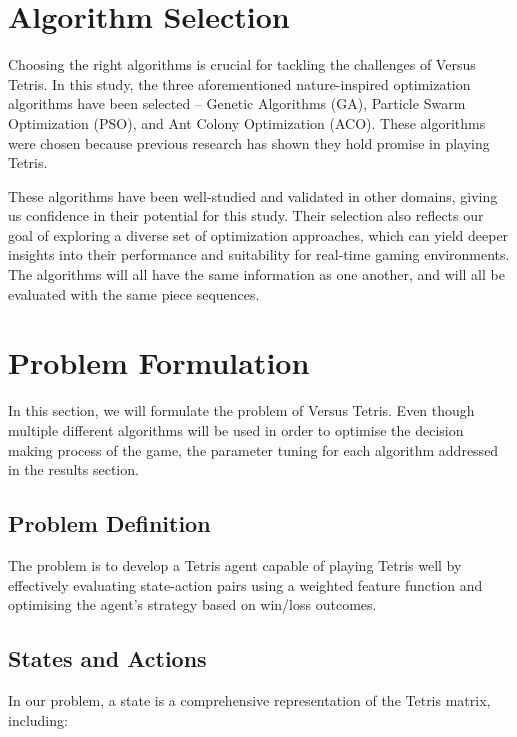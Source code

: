 \documentclass[a4paper, 12pt]{extreport}
\begin{document}
		\section{Algorithm Selection}\label{sec:algo-select}
			Choosing the right algorithms is crucial for tackling the challenges of Versus Tetris. In this study, the three aforementioned nature-inspired optimization algorithms have been selected -- Genetic Algorithms (GA), Particle Swarm Optimization (PSO), and Ant Colony Optimization (ACO). These algorithms were chosen because previous research has shown they hold promise in playing Tetris.
			
			These algorithms have been well-studied and validated in other domains, giving us confidence in their potential for this study. Their selection also reflects our goal of exploring a diverse set of optimization approaches, which can yield deeper insights into their performance and suitability for real-time gaming environments. The algorithms will all have the same information as one another, and will all be evaluated with the same piece sequences.
		
		\section{Problem Formulation}\label{sec:problem-formulation}
		
			In this section, we will formulate the problem of Versus Tetris. Even though multiple different algorithms will be used in order to optimise the decision making process of the game, the parameter tuning for each algorithm addressed in the results section.
		
			\subsection{Problem Definition}
			
				The problem is to develop a Tetris agent capable of playing Tetris well by effectively evaluating state-action pairs using a weighted feature function and optimising the agent's strategy based on win/loss outcomes.
				
			\subsection{States and Actions}
			
				In our problem, a state is a comprehensive representation of the Tetris matrix, including:
				
\end{document}
